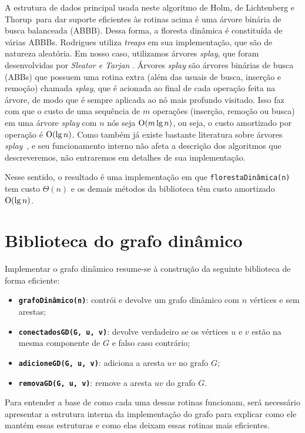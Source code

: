 A estrutura de dados principal usada neste algoritmo de Holm, de Lichtenberg e Thorup~para dar suporte eficientes às rotinas acima é uma árvore binária de busca balanceada (ABBB). Dessa forma, a floresta dinâmica é constituída de várias ABBBs. Rodrigues utiliza \textit{treaps} em sua implementação, que são de natureza aleatória. Em nosso caso, utilizamos árvores \textit{splay}, que foram desenvolvidas por \textit{Sleator e Tarjan} \cite{sleator}. Árvores \textit{splay} são árvores binárias de busca (ABBs) que possuem uma rotina extra (além das usuais de busca, inserção e remoção) chamada \textit{splay}, que é acionada ao final de cada operação feita na árvore, de modo que é sempre aplicada ao nó mais profundo visitado. Isso faz com que o custo de uma sequência de $m$ operações (inserção, remoção ou busca) em uma árvore \textit{splay} com $n$ nós seja $\mathrm{O}(m\lg n)$, ou seja, o custo amortizado por operação é $\mathrm{O}(\lg n)$. Como também já existe bastante literatura sobre árvores \textit{splay}~\cite[Lecture 12]{kozen}, e seu funcionamento interno não afeta a descrição dos algoritmos que descreveremos, não entraremos em detalhes de sua implementação.

Nesse sentido, o resultado é uma implementação em que \texttt{florestaDinâmica(n)} tem custo $\Theta(n)$ e os demais métodos da biblioteca têm custo amortizado $\mathrm{O}(\lg n)$.

\section{Biblioteca do grafo dinâmico}
\label{sec:dynamic-graph-structure}

Implementar o grafo dinâmico resume-se à construção da seguinte biblioteca de forma eficiente:

\begin{itemize}
    \item \texttt{\textbf{grafoDinâmico(n)}}: contrói e devolve um grafo dinâmico com $n$ vértices e sem arestas;
    \item \texttt{\textbf{conectadosGD(G, u, v)}}: devolve verdadeiro se os vértices $u$ e $v$ estão na mesma componente de $G$ e falso caso contrário;
    \item \texttt{\textbf{adicioneGD(G, u, v)}}: adiciona a aresta $uv$ no grafo $G$;
    \item \texttt{\textbf{removaGD(G, u, v)}}: remove a aresta $uv$ do grafo $G$.
\end{itemize} 

Para entender a base de como cada uma dessas rotinas funcionam, será necessário apresentar a estrutura interna da implementação do grafo para explicar como ele mantém essas estruturas e como elas deixam essas rotinas mais eficientes.


